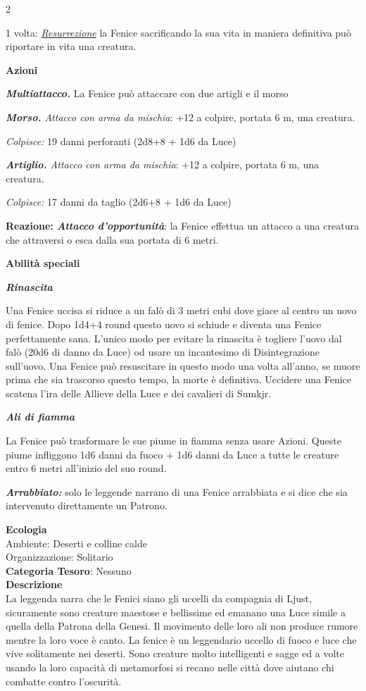 \begin{multicols}{2}
{1 volta: \emph{\hyperlink{Resurrezione}{Resurrezione}} la Fenice sacrificando la sua vita in maniera definitiva può riportare in vita una creatura.

\textbf{Azioni}

\emph{\textbf{Multiattacco.}} La Fenice può attaccare con due artigli e il morso

\emph{\textbf{Morso.} Attacco con arma da mischia}: +12 a colpire, portata 6 m, una creatura.

\emph{Colpisce:} 19 danni perforanti (2d8+8 + 1d6 da Luce)

\emph{\textbf{Artiglio.} Attacco con arma da mischia}: +12 a colpire, portata 6 m, una creatura.

\emph{Colpisce:} 17 danni da taglio (2d6+8 + 1d6 da Luce)

\textbf{Reazione: \emph{Attacco d'opportunità}}: la Fenice effettua un attacco a una creatura che attraversi o esca dalla sua portata di 6 metri.

\textbf{Abilità speciali}

\emph{\textbf{Rinascita}}

Una Fenice uccisa si riduce a un falò di 3 metri cubi dove giace al centro un uovo di fenice. Dopo 1d4+4 round questo uovo si schiude e diventa una Fenice perfettamente sana. L'unico modo per evitare la rinascita è togliere l'uovo dal falò (20d6 di danno da Luce) od usare un incantesimo di Disintegrazione sull'uovo.
Una Fenice può resuscitare in questo modo una volta all'anno, se muore prima che sia trascorso questo tempo, la morte è definitiva. Uccidere una Fenice scatena l'ira delle Allieve della Luce e dei cavalieri di Sumkjr.

\emph{\textbf{Ali di fiamma}}

La Fenice può trasformare le sue piume in fiamma senza usare Azioni. Queste piume infliggono 1d6 danni da fuoco + 1d6 danni da Luce a tutte le creature entro 6 metri all'inizio del suo round.

\emph{\textbf{Arrabbiato:}} solo le leggende narrano di una Fenice arrabbiata e si dice che sia intervenuto direttamente un Patrono.

\textbf{Ecologia}\\
Ambiente: Deserti e colline calde\\
Organizzazione: Solitario\\
\textbf{Categoria Tesoro}: Nessuno\\
\textbf{Descrizione}\\
La leggenda narra che le Fenici siano gli uccelli da compagnia di Ljust, sicuramente sono creature maestose e bellissime ed emanano una Luce simile a quella della Patrona della Genesi. Il movimento delle loro ali non produce rumore mentre la loro voce è canto. La fenice è un leggendario uccello di fuoco e luce che vive solitamente nei deserti. Sono creature molto intelligenti e sagge ed a volte usando la loro capacità di metamorfosi si recano nelle città dove aiutano chi combatte contro l'oscurità.

}
\end{multicols}

